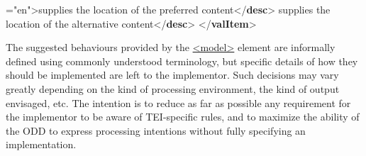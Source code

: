 \begin{shaded}
{\hspace*{1em}\hspace*{1em}\hspace*{1em}\hspace*{1em}{xml:lang}="{en}">}supplies the location of the preferred\mbox{}\newline 
\hspace*{1em}\hspace*{1em}\hspace*{1em}\hspace*{1em}\hspace*{1em}\hspace*{1em} content{</\textbf{desc}>}\mbox{}\newline 
\hspace*{1em}\mbox{}\newline 
\hspace*{1em}\mbox{}\newline 
\hspace*{1em}\hspace*{1em}supplies the location of the alternative\mbox{}\newline 
\hspace*{1em}\hspace*{1em}\hspace*{1em}\hspace*{1em}\hspace*{1em}\hspace*{1em} content{</\textbf{desc}>}\mbox{}\newline 
\hspace*{1em}\mbox{}\newline 
{}\mbox{}\newline 
{</\textbf{valItem}>}\end{shaded}\egroup\par \par
The suggested behaviours provided by the \hyperref[TEI.model]{<model>} element are informally defined using commonly understood terminology, but specific details of how they should be implemented are left to the implementor. Such decisions may vary greatly depending on the kind of processing environment, the kind of output envisaged, etc. The intention is to reduce as far as possible any requirement for the implementor to be aware of TEI-specific rules, and to maximize the ability of the ODD to express processing intentions without fully specifying an implementation.
